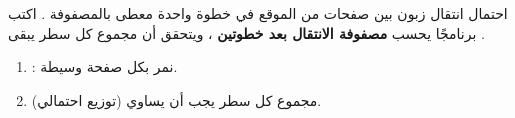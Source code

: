 \begin{statement}
احتمال انتقال زبون بين  صفحات من الموقع في خطوة واحدة معطى بالمصفوفة . اكتب برنامجًا يحسب \textbf{مصفوفة الانتقال بعد خطوتين} ، ويتحقق أن مجموع كل سطر يبقى .
\end{statement}
\begin{stepsbox}\begin{enumerate}
\item \par{\centering\small{}\par}: نمر بكل صفحة وسيطة.
\item مجموع كل سطر يجب أن يساوي  (توزيع احتمالي).
\end{enumerate}\end{stepsbox}
